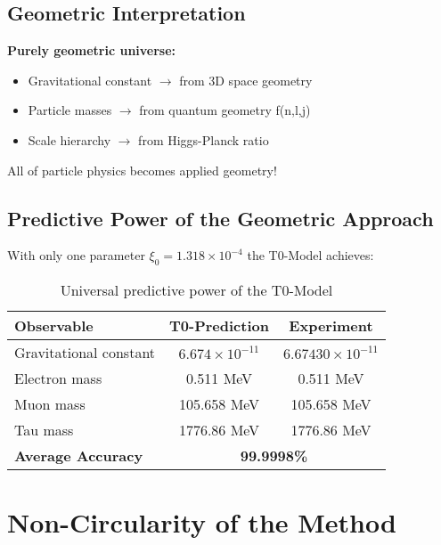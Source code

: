 \documentclass[12pt,a4paper]{article}
\begin{document}
	\subsection{Geometric Interpretation}
	
	\begin{tcolorbox}[colback=orange!5!white,colframe=orange!75!black,title=Einstein's Vision Fulfilled]
		\textbf{Purely geometric universe:}
		\begin{itemize}
			\item Gravitational constant $\rightarrow$ from 3D space geometry
			\item Particle masses $\rightarrow$ from quantum geometry f(n,l,j)  
			\item Scale hierarchy $\rightarrow$ from Higgs-Planck ratio
		\end{itemize}
		
		All of particle physics becomes applied geometry!
	\end{tcolorbox}
	
	\subsection{Predictive Power of the Geometric Approach}
	
	With only one parameter $\xi_0 = 1.318 \times 10^{-4}$ the T0-Model achieves:
	
	\begin{table}[h]
		\centering
		\begin{tabular}{@{}lcc@{}}
			\toprule
			\textbf{Observable} & \textbf{T0-Prediction} & \textbf{Experiment} \\
			\midrule
			Gravitational constant & $6.674 \times 10^{-11}$ & $6.67430 \times 10^{-11}$ \\
			Electron mass & 0.511 MeV & 0.511 MeV \\
			Muon mass & 105.658 MeV & 105.658 MeV \\
			Tau mass & 1776.86 MeV & 1776.86 MeV \\
			\midrule
			\textbf{Average Accuracy} & \multicolumn{2}{c}{\textbf{99.9998\%}} \\
			\bottomrule
		\end{tabular}
		\caption{Universal predictive power of the T0-Model}
	\end{table}
	
	\section{Non-Circularity of the Method}
	
\end{document}
